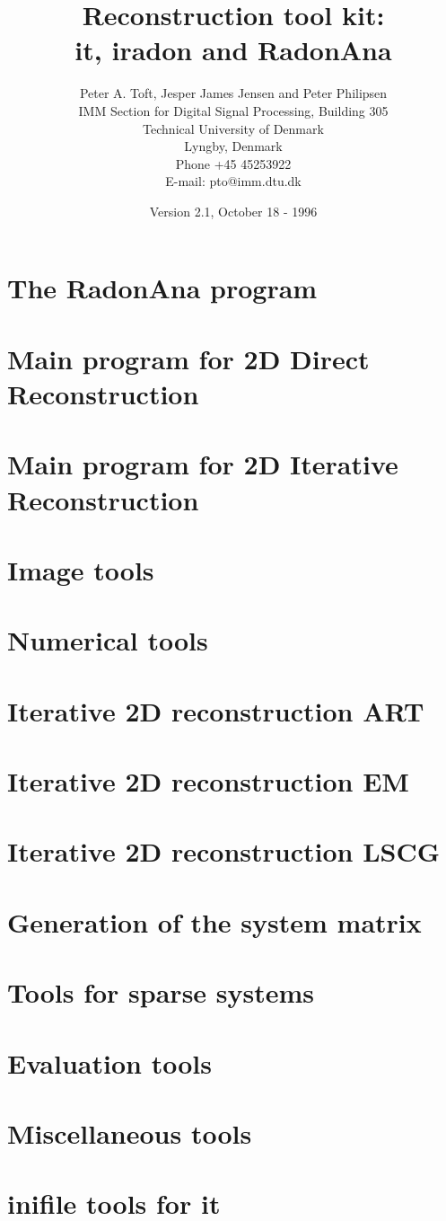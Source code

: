 \documentclass[10pt]{report}
\begin{document}
\newcommand{\tc}[1]{{\tt #1}}
\title{\sf Reconstruction tool kit:\\ it, iradon and RadonAna}
\author{\sf Peter A. Toft, Jesper James Jensen and Peter Philipsen\\
        \sf IMM Section for Digital Signal Processing, Building 305 \\
        \sf Technical University of Denmark \\
         Lyngby, Denmark\\
        \sf Phone +45 45253922 \\
        \sf E-mail: pto@imm.dtu.dk 
        }
\date{{\sf Version 2.1, October 18 - 1996}}
\maketitle
\small
\tableofcontents
\chapter{The RadonAna program}

\chapter{Main program for 2D Direct Reconstruction}

\chapter{Main program for 2D Iterative Reconstruction}

\chapter{Image tools}

\chapter{Numerical tools}


\chapter{Iterative 2D reconstruction ART}

\chapter{Iterative 2D reconstruction EM}

\chapter{Iterative 2D reconstruction LSCG}

\chapter{Generation of the system matrix}

\chapter{Tools for sparse systems}

\chapter{Evaluation tools}

\chapter{Miscellaneous tools}

\chapter{inifile tools for it}

\end{document}
